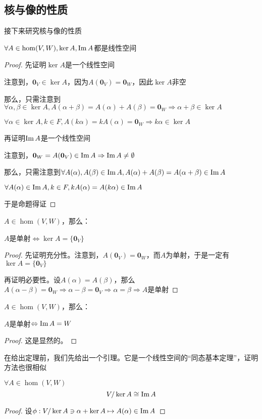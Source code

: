 \documentclass[12pt, a4paper, oneside, UTF8]{ctexbook}
\begin{document}
			\subsection{核与像的性质}
				接下来研究核与像的性质
				\begin{para}{0}
					\point{}
						\begin{proposition}
							$\forall A \in \hom(V,W),\ker A,\operatorname{Im} A$都是线性空间
						\end{proposition}
						\begin{proof}
							先证明$\ker A$是一个线性空间

							注意到，$\mathbf{0}_V \in \ker A$，因为$A(\mathbf{0}_V)=\mathbf{0}_W$，因此$\ker A$非空

							那么，只需注意到$\forall \alpha ,\beta \in \ker A,A(\alpha +\beta )=A(\alpha )+A(\beta )=\mathbf{0}_{W} \Rightarrow \alpha + \beta \in \ker A$

							$\forall \alpha \in \ker A,k \in F,A(k\alpha )=kA(\alpha )=\mathbf{0}_W \Rightarrow k\alpha \in \ker A$

							再证明$\operatorname{Im} A$是一个线性空间

							注意到，$\mathbf{0}_W = A(\mathbf{0}_V) \in \operatorname{Im} A \Rightarrow \operatorname{Im} A \neq \emptyset$

							那么，只需注意到$\forall A(\alpha) ,A(\beta) \in \operatorname{Im} A,A(\alpha )+A(\beta )=A(\alpha +\beta )\in \operatorname{Im} A$

							$\forall A(\alpha )\in \operatorname{Im} A,k \in F,kA(\alpha )=A(k\alpha )\in \operatorname{Im} A$

							于是命题得证
						\end{proof}
					\point{}
						\begin{proposition}
							$A \in \hom(V,W)$，那么：

							$A$是单射$\Leftrightarrow \ker A = \{\mathbf{0}_V\}$
						\end{proposition}
						\begin{proof}
							先证明充分性。注意到，$A(\mathbf{0}_V)=\mathbf{0}_W$，而$A$为单射，于是一定有$\ker A = \{\mathbf{0}_V\}$

							再证明必要性。设$A(\alpha )=A(\beta )$，那么$A(\alpha -\beta )=\mathbf{0}_W \Rightarrow \alpha -\beta =\mathbf{0}_V \Rightarrow \alpha =\beta \Rightarrow A$是单射
						\end{proof}
						\point{}
						\begin{proposition}
							$A \in \hom(V,W)$，那么：

							$A$是单射$\Leftrightarrow \operatorname{Im} A = W$
						\end{proposition}
						\begin{proof}
							这是显然的。
						\end{proof}
						在给出定理前，我们先给出一个引理。它是一个线性空间的“同态基本定理”，证明方法也很相似
						\begin{lemma}{}{}
							$\forall A \in \hom(V,W)$
							\begin{equation}
								V/\ker A \cong \operatorname{Im} A
							\end{equation}
						\end{lemma}
						\begin{proof}
							设$\phi : V/\ker A \ni \alpha + \ker A \mapsto A(\alpha ) \in \operatorname{Im} A$


\end{proof}
\end{para}
\end{document}
